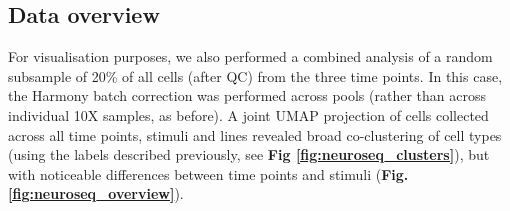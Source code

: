 










\newpage

\subsection{Data overview}

For visualisation purposes, we also performed a combined analysis of a random subsample of 20\% of all cells (after QC) from the three time points.
In this case, the Harmony batch correction was performed across pools (rather than across individual 10X samples, as before).
A joint UMAP projection of cells collected across all time points, stimuli and lines revealed broad co-clustering of cell types (using the labels described previously, see \textbf{Fig \ref{fig:neuroseq_clusters}}), but with noticeable differences between time points and stimuli (\textbf{Fig. \ref{fig:neuroseq_overview}}). \\

